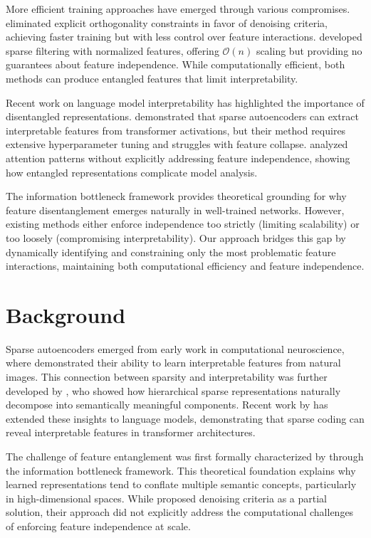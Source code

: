 \documentclass{article} %
\begin{document}
More efficient training approaches have emerged through various compromises. \cite{Vincent2010StackedDA} eliminated explicit orthogonality constraints in favor of denoising criteria, achieving faster training but with less control over feature interactions. \cite{Ngiam2011SparseF} developed sparse filtering with normalized features, offering $\mathcal{O}(n)$ scaling but providing no guarantees about feature independence. While computationally efficient, both methods can produce entangled features that limit interpretability.

Recent work on language model interpretability has highlighted the importance of disentangled representations. \cite{Kissane2024InterpretingAL} demonstrated that sparse autoencoders can extract interpretable features from transformer activations, but their method requires extensive hyperparameter tuning and struggles with feature collapse. \cite{DeRose2020AttentionFA} analyzed attention patterns without explicitly addressing feature independence, showing how entangled representations complicate model analysis.

The information bottleneck framework \cite{Tishby2000TheIB} provides theoretical grounding for why feature disentanglement emerges naturally in well-trained networks. However, existing methods either enforce independence too strictly (limiting scalability) or too loosely (compromising interpretability). Our approach bridges this gap by dynamically identifying and constraining only the most problematic feature interactions, maintaining both computational efficiency and feature independence.

\section{Background}
\label{sec:background}

Sparse autoencoders emerged from early work in computational neuroscience, where \cite{Olshausen1996EmergenceOS} demonstrated their ability to learn interpretable features from natural images. This connection between sparsity and interpretability was further developed by \cite{Lee2010UnsupervisedFL}, who showed how hierarchical sparse representations naturally decompose into semantically meaningful components. Recent work by \cite{Kissane2024InterpretingAL} has extended these insights to language models, demonstrating that sparse coding can reveal interpretable features in transformer architectures.

The challenge of feature entanglement was first formally characterized by \cite{Tishby2000TheIB} through the information bottleneck framework. This theoretical foundation explains why learned representations tend to conflate multiple semantic concepts, particularly in high-dimensional spaces. While \cite{Vincent2010StackedDA} proposed denoising criteria as a partial solution, their approach did not explicitly address the computational challenges of enforcing feature independence at scale.
\end{document}
